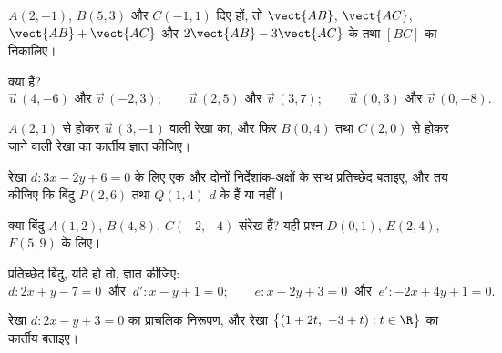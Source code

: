 \begin{exercise}[$\star$]\label{exo:g11:vect:1}
$A(2, -1)$, $B(5, 3)$ और $C(-1, 1)$ दिए हों, तो $\vect{AB}$, $\vect{AC}$, $\vect{AB} + \vect{AC}$ और $2\vect{AB} -
3\vect{AC}$ के 
तथा $[BC]$ का  निकालिए।
\end{exercise}

\begin{exercise}[$\star$]\label{exo:g11:vect:2}
क्या   हैं?
\[
\vec u\,(4, -6) \text{ और } \vec v\,(-2, 3); \qquad
\vec u\,(2, 5) \text{ और } \vec v\,(3, 7); \qquad
\vec u\,(0, 3) \text{ और } \vec v\,(0, -8).
\]
\end{exercise}

\begin{exercise}[$\star$]\label{exo:g11:vect:3}
$A(2, 1)$ से होकर  $\vec u\,(3, -1)$ वाली रेखा का, और फिर $B(0, 4)$ तथा $C(2, 0)$ से होकर
जाने वाली रेखा का कार्तीय  ज्ञात कीजिए।
\end{exercise}

\begin{exercise}[$\star$]\label{exo:g11:vect:4}
रेखा $d: 3x - 2y + 6 = 0$ के लिए एक  और दोनों निर्देशांक-अक्षों के साथ प्रतिच्छेद
बताइए, और तय कीजिए कि बिंदु $P(2, 6)$ तथा $Q(1, 4)$ $d$ के हैं या नहीं।
\end{exercise}

\begin{exercise}[$\star\star$]\label{exo:g11:vect:5}
क्या बिंदु $A(1, 2)$, $B(4, 8)$, $C(-2, -4)$ संरेख हैं? यही प्रश्न $D(0, 1)$, $E(2, 4)$, $F(5, 9)$ के
लिए।
\end{exercise}

\begin{exercise}[$\star\star$]\label{exo:g11:vect:6}
प्रतिच्छेद बिंदु, यदि हो तो, ज्ञात कीजिए:
\[
d: 2x + y - 7 = 0 \ \text{ और }\ d': x - y + 1 = 0;
\qquad
e: x - 2y + 3 = 0 \ \text{ और }\ e': -2x + 4y + 1 = 0 .
\]
\end{exercise}

\begin{exercise}[$\star\star$]\label{exo:g11:vect:7}
रेखा $d: 2x - y + 3 = 0$ का प्राचलिक निरूपण, और रेखा $\bigl\{(1 + 2t,\ -3 + t) : t \in \R\bigr\}$ का कार्तीय  बताइए।
\end{exercise}

